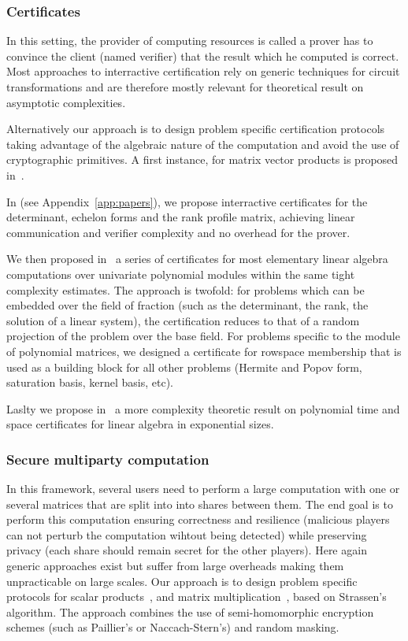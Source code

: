 \documentclass{deliverablereport}
\begin{document}
\subsubsection{Certificates}

In this setting, the provider of computing resources is called a prover has to
convince the client (named verifier) that the result which he computed is
correct.
Most approaches to interractive certification rely on generic techniques for
circuit transformations and are therefore mostly relevant for theoretical result
on asymptotic complexities. 

Alternatively our approach is to design problem specific certification protocols
taking advantage of the algebraic nature of the computation and avoid the use of
cryptographic primitives. A first instance, for matrix vector products is
proposed in~\cite{DuZu17}.

In \cite{DLP17} (see Appendix~\ref{app:papers}), we propose interractive
certificates for the determinant, echelon forms and the rank profile matrix,
achieving linear communication and verifier complexity and no overhead for the prover.

We then proposed in~\cite{LNPRR18}  a series of certificates for most
elementary linear algebra computations over univariate polynomial modules within
the same tight complexity estimates. The approach is twofold: for problems which
can be embedded over the field of fraction (such as the determinant, the rank,
the solution of a linear system), the certification reduces to that of a random
projection of the problem over the base field. For problems specific to the
module of polynomial matrices, we designed a certificate for rowspace membership
that is used as a building block for all other problems (Hermite and Popov form,
saturation basis, kernel basis, etc).

Laslty we propose in~\cite{DKVZ17} a more complexity theoretic result on
polynomial time and space certificates for linear algebra in exponential sizes.

\subsubsection{Secure multiparty computation}

In this framework, several users need to perform a large computation with one or several
matrices that are split into into shares between them. The end goal is to
perform this computation ensuring correctness and resilience (malicious players
can not perturb the computation wihtout being detected) while preserving privacy (each
share should remain secret for the other players).
Here again generic approaches exist but suffer from large overheads making them
unpracticable on large scales.
Our approach is to design problem specific protocols for scalar
products~\cite{DLOP17}, and matrix multiplication~\cite{DFLLOPP18}, based on
Strassen's algorithm. The approach combines the use of semi-homomorphic
encryption schemes (such as Paillier's or Naccach-Stern's) and random masking.
\end{document}
